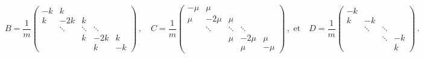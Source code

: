 $$
B = \frac{1}{m} \begin{pmatrix}
    -k & k &  &  &  \\
    k & -2k & k &  &  \\
     & \ddots & \ddots & \ddots &  \\
     &  & k & -2k & k \\
     &  &  & k & -k
    \end{pmatrix} \, , \quad 
C = \frac{1}{m} \begin{pmatrix}
    -\mu & \mu &  &  &  \\
    \mu & -2\mu & \mu &  &  \\
     & \ddots & \ddots & \ddots &  \\
     &  & \mu & -2\mu & \mu \\
     &  &  & \mu & -\mu
    \end{pmatrix} \, , \text{ et}\quad 
D = \frac{1}{m} \begin{pmatrix}
    -k &  &  &  \\
    k & -k &  &  \\
     & \ddots & \ddots &  \\
     &  & \ddots & -k \\
     &  &  & k 
    \end{pmatrix}\,.
$$

